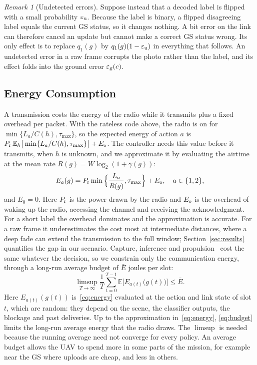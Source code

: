 \documentclass[5p,twocolumn]{elsarticle}
\theoremstyle{remark}
\newtheorem{remark}{Remark}
\newcommand{\E}{\mathbb{E}}
\newcommand{\ee}{\varepsilon}
\begin{document}
\begin{remark}[Undetected errors]\label{rem:flip}
Suppose instead that a decoded label is flipped with a small probability $\ee_{\rm u}$. Because the label is binary, a flipped disagreeing label equals the current GS status, so it changes nothing. A bit error on the link can therefore cancel an update but cannot make a correct GS status wrong. Its only effect is to replace $q_1(g)$ by $q_1(g)(1-\ee_{\rm u})$ in everything that follows. An undetected error in a raw frame corrupts the photo rather than the label, and its effect folds into the ground error $\ee_{\rm g}(c)$.
\end{remark}

\subsection{Energy Consumption}
A transmission costs the energy of the radio while it transmits plus a fixed overhead per packet. With the rateless code above, the radio is on for $\min\{L_a/C(h),\tau_{\max}\}$, so the expected energy of action $a$ is $P_{\rm r}\,\E_h\big[\min\{L_a/C(h),\tau_{\max}\}\big]+E_{\rm o}$. The controller needs this value before it transmits, when $h$ is unknown, and we approximate it by evaluating the airtime at the mean rate $\bar R(g)=W\log_2(1+\bar\gamma(g))$:
\begin{equation}\label{eq:energy}
E_a(g)=P_{\rm r}\min\Big\{\frac{L_a}{\bar R(g)},\tau_{\max}\Big\}+E_{\rm o},\quad a\in\{1,2\},
\end{equation}
and $E_0=0$. Here $P_{\rm r}$ is the power drawn by the radio and $E_{\rm o}$ is the overhead of waking up the radio, accessing the channel and receiving the acknowledgment. For a short label the overhead dominates and the approximation is accurate. For a raw frame it underestimates the cost most at intermediate distances, where a deep fade can extend the transmission to the full window; Section~\ref{sec:results} quantifies the gap in our scenario. Capture, inference and propulsion~\cite{zeng2019rotary} cost the same whatever the decision, so we constrain only the communication energy, through a long-run average budget of $\bar E$ joules per slot:
\begin{equation}\label{eq:budget}
\limsup_{T\to\infty}\frac1T\sum_{t=0}^{T-1}\E\Big[E_{a(t)}\big(g(t)\big)\Big]\le\bar E.
\end{equation}
Here $E_{a(t)}(g(t))$ is~\eqref{eq:energy} evaluated at the action and link state of slot $t$, which are random: they depend on the scene, the classifier outputs, the blockage and past deliveries. Up to the approximation in~\eqref{eq:energy}, \eqref{eq:budget} limits the long-run average energy that the radio draws. The $\limsup$ is needed because the running average need not converge for every policy. An average budget allows the UAV to spend more in some parts of the mission, for example near the GS where uploads are cheap, and less in others.
\end{document}
